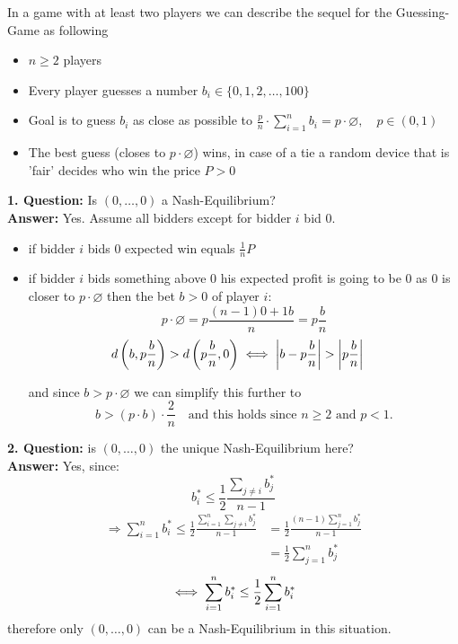 \begin{example} 
	In a game with at least two players we can describe the sequel for the Guessing-Game as following
	\begin{itemize}
		\item $n \geq 2$ players
		\item Every player guesses a number $b_{i} \in \{0, 1, 2, \dotsc, 100 \}$
		\item Goal is to guess $b_{i}$ as close as possible to $\frac{p}{n} \cdot \sum_{i = 1}^{n} b_{i} = p \cdot \varnothing, \quad p \in (0, 1)$
		\item The best guess (closes to $p \cdot \varnothing$) wins, in case of a tie a random device that is 'fair' decides who win the price $P > 0$
	\end{itemize}
	
	
	\textbf{1. Question:} Is $(0, \dotsc, 0)$ a Nash-Equilibrium? \\
	\textbf{Answer:} Yes. Assume all bidders except for bidder $i$ bid $0$.	
		\begin{itemize}
			\item if bidder $i$ bids $0$ expected win equals $\frac{1}{n} P $
			\item if bidder $i$ bids something above $0$ his expected profit is going to be $0$ as $0$ is closer to $p \cdot \varnothing$ then the bet $b > 0$ of player $i$:
			\[ p \cdot \varnothing = p \frac{(n - 1)0 + 1 b}{n} = p \frac{b}{n} \]
			\[
				d \left( b, p \frac{b}{n} \right) > d \left( p \frac{b}{n}, 0 \right)	\iff \left| b - p \frac{b}{n} \right| > \left| p \frac{b}{n} \right| \quad
			\]
			
			and since $b > p \cdot \varnothing$ we can simplify this further to
			\[ b > \left( p \cdot b \right) \cdot \frac{2}{n} \quad \text{and this holds since } n \geq 2 \text{ and } p < 1.\]
		\end{itemize}
		
	
	\textbf{2. Question:} is $(0, \dotsc, 0)$ the unique Nash-Equilibrium here? \\
	\textbf{Answer:} Yes, since:	
	\[ b_{i}^{*} \leq \frac{1}{2} \frac{\sum_{j \neq i} b_{j}^{*}}{n - 1} \]
	\begin{align*}
		\Rightarrow \sum_{i = 1}^{n} b_{i}^{*} \leq \frac{1}{2} \frac{\sum_{i = 1}^{n} \sum_{j \neq i} b_{j}^{*}}{n - 1} & = \frac{1}{2} \frac{(n - 1) \sum_{j = 1}^{n} b_{j}^{*}}{n - 1} \\
		& = \frac{1}{2} \sum_{j = 1}^{n} b_{j}^{*}
	\end{align*} 
	\[ \iff \sum_{i = 1}^{n} b_{i}^{*} \leq \frac{1}{2} \sum_{i = 1}^{n} b_{i}^{*} \]
	therefore only $(0, \dotsc,  0)$ can be a Nash-Equilibrium in this situation. \\



\end{example}
